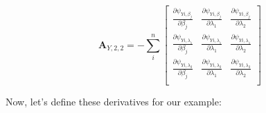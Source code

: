 \documentclass[]{article}
\begin{document}
  \[
  \pmb{A}_{Y,2,2} = -\sum_i^n\begin{bmatrix}
      \frac{\partial \psi_{Yi,\beta_j}}{ \partial \beta_j} &
      \frac{\partial \psi_{Yi,\beta_j}}{ \partial \lambda_1} &
      \frac{\partial \psi_{Yi,\beta_j}}{ \partial \lambda_2} \\
      \frac{\partial \psi_{Yi,\lambda_1}}{ \partial \beta_j} &
      \frac{\partial \psi_{Yi,\lambda_1}}{ \partial \lambda_1} &
      \frac{\partial \psi_{Yi,\lambda_1}}{ \partial \lambda_2} \\
      \frac{\partial \psi_{Yi,\lambda_2}}{ \partial \beta_j} &
      \frac{\partial \psi_{Yi,\lambda_2}}{ \partial \lambda_1} &
      \frac{\partial \psi_{Yi,\lambda_2}}{ \partial \lambda_2}\\
  \end{bmatrix}
  \]

Now, let's define these derivatives for our example:
\end{document}

